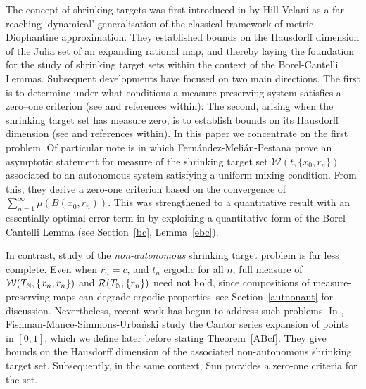 \documentclass[11pt,reqno]{amsart}
\newcommand{\N}{{\Bbb N}}
\newcommand{\0}{\mathbf{0}}
\theoremstyle{remark}
\numberwithin{equation}{section}
\theoremstyle{remark}
\numberwithin{equation}{section}
\begin{document}
The concept of shrinking targets was first introduced in \cite{hv} by Hill-Velani as a far-reaching `dynamical' generalisation of the classical framework of metric Diophantine approximation. They established bounds on the Hausdorff dimension of the Julia set of an expanding rational map, and thereby laying the foundation for the study of shrinking target sets within the context of the Borel-Cantelli Lemmas. 
Subsequent developments have focused on two main directions. The first is to determine under what conditions a measure-preserving system satisfies a zero–one criterion (see \cite{BERFS, FMP, kim2007, LLVZ} and references within). The second, arising when the shrinking target set has measure zero, is to establish bounds on its Hausdorff dimension (see \cite{baker2024, li2014} and references within). In this paper we concentrate on the first problem. Of particular note is \cite{FMP} in which Fern\'{a}ndez-Meli\'{a}n-Pestana prove an asymptotic statement for measure of the shrinking target set $\mathcal{W}(t, \{x_0, r_n\})$ associated to an autonomous system satisfying a uniform mixing condition. From this, they derive a zero-one criterion based on the convergence of $\sum_{n=1}^\infty \mu(B(x_0,r_n))$. This was strengthened to a quantitative result with an essentially optimal error term in \cite{LLVZ} by exploiting a quantitative form of the Borel-Cantelli Lemma (see  Section~\ref{bc}, Lemma~\ref{ebc}).  


In contrast, study of the \emph{non-autonomous} shrinking target problem is  far less complete. Even when $r_n = c$, and $t_n$ ergodic for all $n$, full measure of $\mathcal{W}(T_\N,\{x_n, r_n\})$ and $\mathcal{R}(T_\N,\{r_n\})$ need not hold, since compositions of measure-preserving maps can degrade ergodic properties--see Section~\ref{autnonaut} for discussion. Nevertheless, recent work has begun to address such problems. 
In \cite{simurb}, Fishman-Mance-Simmons-Urba\'{n}ski study the Cantor series expansion of points in $[0,1]$, which we define later before  stating Theorem~\ref{ABcf}. They give bounds on the Hausdorff dimension of the associated non-autonomous shrinking target set. Subsequently, in the same context, Sun \cite[Theorem~1.1]{Sun}  provides a zero-one criteria for the set.
\end{document}

